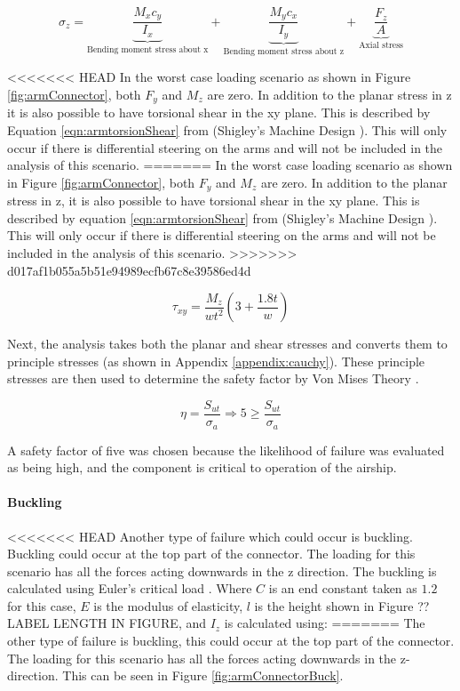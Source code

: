 \documentclass[../main.tex]{subfiles}
\begin{document}
\begin{equation}
\label{eqn:connectorztress}
\sigma_{z}=  \underbrace{\frac{M_{x}c_y}{I_x}}_\text{Bending moment stress about x} + \underbrace{\frac{M_{y}c_x}{I_y}}_\text{Bending moment stress about z} + \underbrace{\frac{F_z}{A}}_\text{Axial stress} 
\end{equation}

<<<<<<< HEAD
In the worst case loading scenario as shown in Figure \ref{fig:armConnector}, both $F_y$ and $M_z$ are zero. In addition to the planar stress in z it is also possible to have torsional shear in the xy plane. This is described by Equation \ref{eqn:armtorsionShear} from {(Shigley's Machine Design \cite[102]{shigley})}. This will only occur if there is differential steering on the arms and will not be included in the analysis of this scenario.
=======
In the worst case loading scenario as shown in Figure \ref{fig:armConnector}, both $F_y$ and $M_z$ are zero. In addition to the planar stress in z, it is also possible to have torsional shear in the xy plane. This is described by equation \ref{eqn:armtorsionShear} from {(Shigley's Machine Design \cite[102]{shigley})}. This will only occur if there is differential steering on the arms and will not be included in the analysis of this scenario.
>>>>>>> d017af1b055a5b51e94989ecfb67c8e39586ed4d

\begin{equation} \label{eqn:armtorsionShear}
\tau_{xy} = \dfrac{M_{z}}{wt^2}(3+\frac{1.8t}{w})
\end{equation}

Next, the analysis takes both the planar and shear stresses and converts them to principle stresses (as shown in Appendix \ref{appendix:cauchy}). These principle stresses are then used to determine the safety factor by Von Mises Theory \cite[221]{shigley}.

\begin{equation}
\eta = \dfrac{S_{ut}}{\sigma _a} \Rightarrow 5 \geq \dfrac{S_{ut}}{\sigma _a}
\end{equation}

A safety factor of five was chosen because the likelihood of failure was evaluated as being high, and the component is critical to operation of the airship.

\paragraph*{Buckling}
<<<<<<< HEAD
Another type of failure which could occur is buckling. Buckling could occur at the top part of the connector. The loading for this scenario has all the forces acting downwards in the z direction. The buckling is calculated using Euler's critical load \cite[178]{shigley}. Where $C$ is an end constant taken as $1.2$ for this case, $E$ is the modulus of elasticity, $l$ is the height shown in Figure ?? LABEL LENGTH IN FIGURE, and $I_z$ is calculated using: 
=======
The other type of failure is buckling, this could occur at the top part of the connector. The loading for this scenario has all the forces acting downwards in the z-direction. This can be seen  in Figure \ref{fig:armConnectorBuck}.
\end{document}
